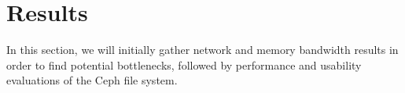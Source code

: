 \section{Results}
\label{sec:results}

In this section, we will initially gather network and memory bandwidth results in order to find potential bottlenecks, followed by performance and usability evaluations of the Ceph file system.












